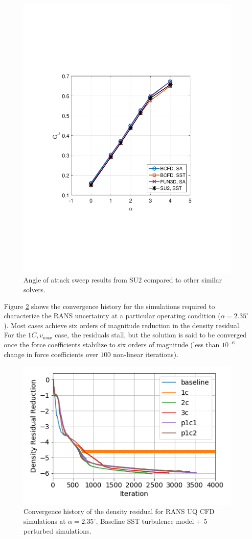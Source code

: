 \begin{figure}{
\centering
    \includegraphics[trim=80 180 80 200, clip, width=.68\textwidth]{suthesis/images/dpw4_alpha_sweep.pdf} 
    \caption{Angle of attack sweep results from SU2 compared to other similar solvers. \label{fig:dpw4_alpha_sweep}}
    \hfill
}
\end{figure}

Figure \ref{fig:convergence_history} shows the convergence history for the simulations required to characterize the RANS uncertainty at a particular operating condition ($\alpha = 2.35^\circ$).
Most cases achieve six orders of magnitude reduction in the density residual.
For the $1C, v_{max}$ case, the residuals stall, but the solution is said to be converged once the force coefficients stabilize to six orders of magnitude (less than $10^{-6}$ change in force coefficients over $100$ non-linear iterations).

\begin{figure}{
\centering
    \includegraphics[trim=0 0 0 0, clip, width=.7\textwidth]{suthesis/images/convergence_history.png} 
    \caption{Convergence history of the density residual for RANS UQ CFD simulations at $\alpha = 2.35^\circ$, Baseline SST turbulence model + $5$ perturbed simulations. \label{fig:convergence_history}}
    \hfill
}
\end{figure}

